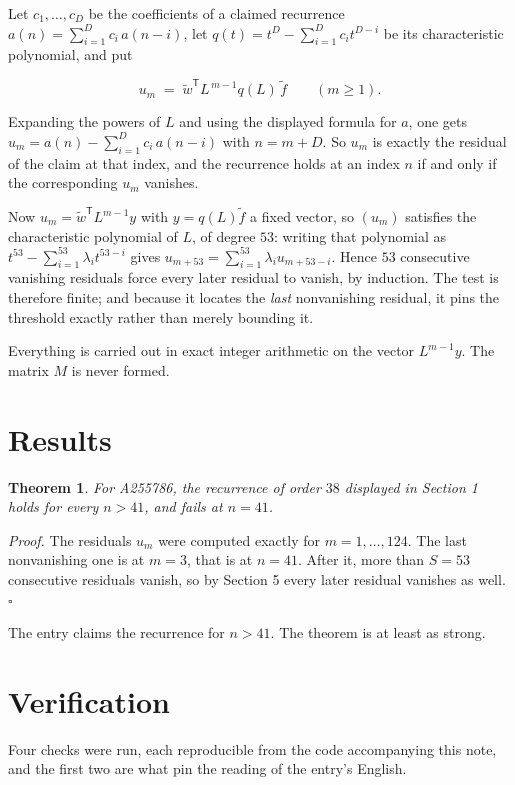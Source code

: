 \documentclass[11pt]{article}
\newtheorem{theorem}{Theorem}
\theoremstyle{definition}
\begin{document}
Let $c_1,\dots,c_D$ be the coefficients of a claimed recurrence $a(n) = \sum_{i=1}^{D} c_i\,a(n-i)$, let $q(t) = t^{D} - \sum_{i=1}^{D} c_i t^{D-i}$ be its characteristic polynomial, and put

\[u_m \;=\; \tilde w^{\mathsf T} L^{\,m-1} q(L)\,\tilde f \qquad (m \ge 1).\]

Expanding the powers of $L$ and using the displayed formula for $a$, one gets $u_m = a(n) - \sum_{i=1}^{D} c_i\,a(n-i)$ with $n = m + D$. So $u_m$ is exactly the residual of the claim at that index, and the recurrence holds at an index $n$ if and only if the corresponding $u_m$ vanishes.

Now $u_m = \tilde w^{\mathsf T} L^{m-1} y$ with $y = q(L)\tilde f$ a fixed vector, so $(u_m)$ satisfies the characteristic polynomial of $L$, of degree $53$: writing that polynomial as $t^{53} - \sum_{i=1}^{53} \lambda_i t^{53-i}$ gives $u_{m+53} = \sum_{i=1}^{53} \lambda_i u_{m+53-i}$. Hence $53$ consecutive vanishing residuals force every later residual to vanish, by induction. The test is therefore finite; and because it locates the {\itshape last} nonvanishing residual, it pins the threshold exactly rather than merely bounding it.

Everything is carried out in exact integer arithmetic on the vector $L^{m-1}y$. The matrix $M$ is never formed.

\section{Results}

\begin{theorem} For A255786, the recurrence of order $38$ displayed in Section 1 holds for every $n > 41$, and fails at $n = 41$.\end{theorem}

{\itshape Proof.} The residuals $u_m$ were computed exactly for $m = 1,\dots,124$. The last nonvanishing one is at $m = 3$, that is at $n = 41$. After it, more than $S = 53$ consecutive residuals vanish, so by Section 5 every later residual vanishes as well. $\square$

The entry claims the recurrence for $n > 41$. The theorem is at least as strong.

\section{Verification}

Four checks were run, each reproducible from the code accompanying this note, and the first two are what pin the reading of the entry's English.
\end{document}
